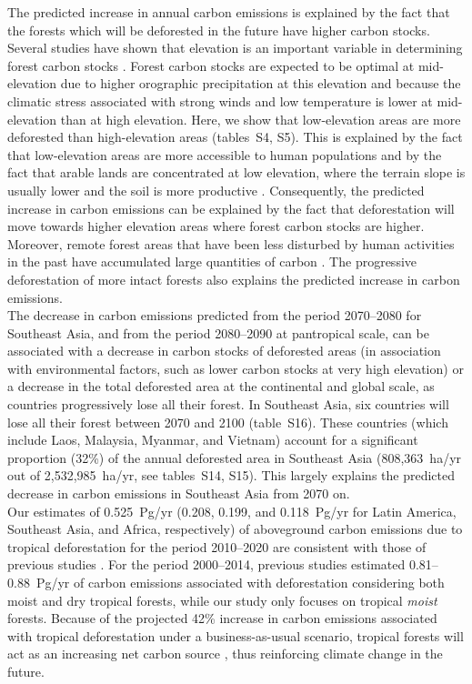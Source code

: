 \documentclass[
  12pt,
]{article}
\begin{document}
The predicted increase in annual carbon emissions is explained by the fact that the forests which will be deforested in the future have higher carbon stocks. Several studies have shown that elevation is an important variable in determining forest carbon stocks \citep{Vieilledent2016, Saatchi2011}. Forest carbon stocks are expected to be optimal at mid-elevation \citep{Vieilledent2016} due to higher orographic precipitation at this elevation and because the climatic stress associated with strong winds and low temperature is lower at mid-elevation than at high elevation. Here, we show that low-elevation areas are more deforested than high-elevation areas (tables~S4, S5). This is explained by the fact that low-elevation areas are more accessible to human populations and by the fact that arable lands are concentrated at low elevation, where the terrain slope is usually lower and the soil is more productive \citep{Geist2002}. Consequently, the predicted increase in carbon emissions can be explained by the fact that deforestation will move towards higher elevation areas where forest carbon stocks are higher. Moreover, remote forest areas that have been less disturbed by human activities in the past have accumulated large quantities of carbon \citep{Dargie2017, Brinck2017}. The progressive deforestation of more intact forests also explains the predicted increase in carbon emissions.\\

The decrease in carbon emissions predicted from the period 2070--2080 for Southeast Asia, and from the period 2080--2090 at pantropical scale, can be associated with a decrease in carbon stocks of deforested areas (in association with environmental factors, such as lower carbon stocks at very high elevation) or a decrease in the total deforested area at the continental and global scale, as countries progressively lose all their forest. In Southeast Asia, six countries will lose all their forest between 2070 and 2100 (table~S16). These countries (which include Laos, Malaysia, Myanmar, and Vietnam) account for a significant proportion (32\%) of the annual deforested area in Southeast Asia (808,363~ha/yr out of 2,532,985~ha/yr, see tables~S14, S15). This largely explains the predicted decrease in carbon emissions in Southeast Asia from 2070 on.\\

Our estimates of 0.525~Pg/yr (0.208, 0.199, and 0.118~Pg/yr for Latin America, Southeast Asia, and Africa, respectively) of aboveground carbon emissions due to tropical deforestation for the period 2010--2020 are consistent with those of previous studies \citep{Baccini2017, Achard2014, Harris2012}. For the period 2000--2014, previous studies estimated 0.81--0.88~Pg/yr of carbon emissions associated with deforestation considering both moist and dry tropical forests, while our study only focuses on tropical \emph{moist} forests. Because of the projected 42\% increase in carbon emissions associated with tropical deforestation under a business-as-usual scenario, tropical forests will act as an increasing net carbon source \citep{Baccini2017}, thus reinforcing climate change in the future.\\
\end{document}
